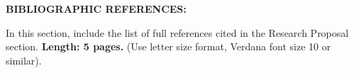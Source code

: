 \noindent\textbf{BIBLIOGRAPHIC REFERENCES:}

\medskip

\noindent In this section, include the list of full references cited in the Research Proposal section.
\textbf{Length: 5 pages.}
(Use letter size format, Verdana font size 10 or similar).



